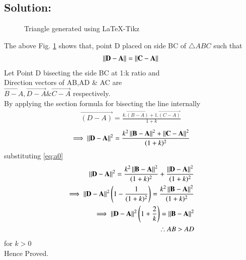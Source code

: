 \documentclass[journal,12pt,twocolumn]{IEEEtran}
\begin{document}
\subsection*{Solution:}
\begin{figure}[!ht]
\centering
\resizebox{\columnwidth}{!}{}
\caption{Triangle generated using LaTeX-Tikz}
\label{fig:tri}	
\end{figure}
The above Fig. \ref{fig:tri} shows that, point D placed on side BC of $\triangle ABC$ such that 
\begin{align}
\left\lVert\mathbf{D-A}\right\rVert = \left\lVert\mathbf{C-A}\right\rVert
\label{eq:a0}
\end{align}
Let Point D bisecting the side BC at 1:k ratio and\\
Direction vectors of AB,AD \& AC are\\
$\vec{B-A}, \vec{D-A} \& \vec{C-A}$ respectively.\\
By applying the section formula for bisecting the line internally 
\begin{align}
\vec{(D-A)} = \frac{k.\vec{(B-A)}+ 1.\vec{(C-A)}}{1+k}
\end{align}
\begin{align}
\implies \left\lVert\mathbf{D-A}\right\rVert^2=\frac{k^2 \left\lVert\mathbf{B-A}\right\rVert^2 + \left\lVert\mathbf{C-A}\right\rVert^2}{(1+k)^2}
\end{align}
substituting \eqref{eq:a0}
\begin{align}
\left\lVert\mathbf{D-A}\right\rVert^2=\frac{k^2 \left\lVert\mathbf{B-A}\right\rVert^2}{(1+k)^2}+\frac{\left\lVert\mathbf{D-A}\right\rVert^2}{(1+k)^2}\\
\implies \left\lVert\mathbf{D-A}\right\rVert^2 \left(1-\frac{1}{(1+k)^2}\right)=\frac{k^2 \left\lVert\mathbf{B-A}\right\rVert^2}{(1+k)^2}\\
\implies \left\lVert\mathbf{D-A}\right\rVert^2 \left(1+\frac{2}{k}\right) = \left\lVert\mathbf{B-A}\right\rVert^2\\
\therefore AB > AD 
\end{align}
for $k > 0$\\
Hence Proved.
\end{document}
